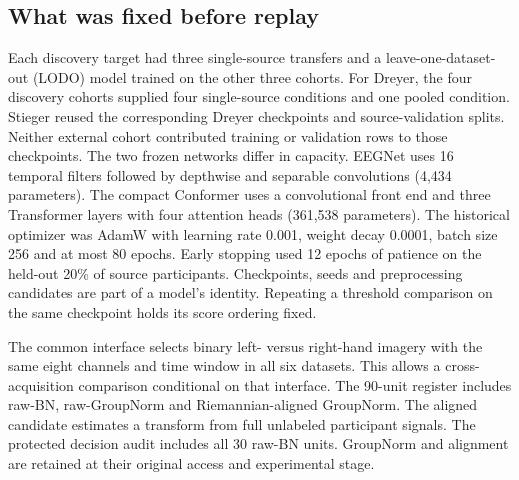 \subsection{What was fixed before replay}
Each discovery target had three single-source transfers and a leave-one-dataset-out (LODO) model trained on the other three cohorts. For Dreyer, the four discovery cohorts supplied four single-source conditions and one pooled condition. Stieger reused the corresponding Dreyer checkpoints and source-validation splits. Neither external cohort contributed training or validation rows to those checkpoints. The two frozen networks differ in capacity. EEGNet uses 16 temporal filters followed by depthwise and separable convolutions (4,434 parameters). The compact Conformer uses a convolutional front end and three Transformer layers with four attention heads (361,538 parameters). The historical optimizer was AdamW with learning rate 0.001, weight decay 0.0001, batch size 256 and at most 80 epochs. Early stopping used 12 epochs of patience on the held-out 20\% of source participants. Checkpoints, seeds and preprocessing candidates are part of a model's identity. Repeating a threshold comparison on the same checkpoint holds its score ordering fixed.

The common interface selects binary left- versus right-hand imagery with the same eight channels and time window in all six datasets. This allows a cross-acquisition comparison conditional on that interface. The 90-unit register includes raw-BN, raw-GroupNorm and Riemannian-aligned GroupNorm. The aligned candidate estimates a transform from full unlabeled participant signals. The protected decision audit includes all 30 raw-BN units. GroupNorm and alignment are retained at their original access and experimental stage.
